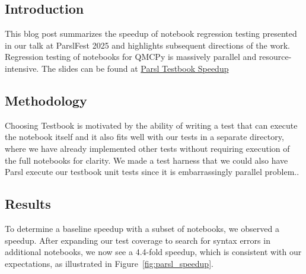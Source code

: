\subsection{Introduction}

 This blog post summarizes the speedup of notebook regression testing presented in our talk at ParslFest 2025 \cite{parslfest2025} 
 and highlights subsequent directions of the work. Regression testing of notebooks for QMCPy \cite{QMCPy2020a} is massively parallel and resource-intensive. The slides can be found at \href{https://github.com/QMCSoftware/QMCSoftware/raw/refs/heads/parsl_presentation/demos/talk_paper_demos/Parslfest_2025/Parsl%20Testbook%20Speedup.pptx}{Parsl Testbook Speedup}

\subsection{Methodology}

 Choosing Testbook \cite{testbook2021} is motivated by the ability of writing a test that can execute the notebook itself and it also fits well with our tests in a separate directory, where we have already implemented other tests without requiring execution of the full notebooks for clarity. We made a test harness that we could also have Parsl \cite{parsl2019} execute our testbook unit tests since it is embarrassingly parallel problem..

\subsection{Results}

To determine a baseline speedup with a subset of notebooks, we observed a speedup. 
After expanding our test coverage to search for syntax errors in additional notebooks, we now see a 4.4-fold speedup, which is consistent with our expectations, as illustrated in Figure~\ref{fig:parsl_speedup}. 

